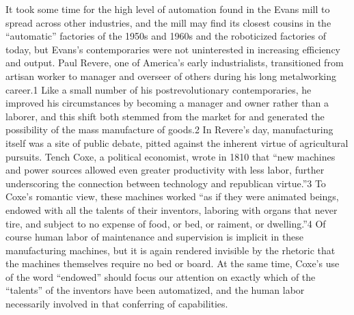 It took some time for the high level of automation found in the Evans
mill to spread across other industries, and the mill may find its
closest cousins in the “automatic” factories of the 1950s and 1960s
and the roboticized factories of today, but Evans's contemporaries
were not uninterested in increasing efficiency and output. Paul
Revere, one of America's early industrialists, transitioned from
artisan worker to manager and overseer of others during his long
metalworking career.1 Like a small number of his postrevolutionary
contemporaries, he improved his circumstances by becoming a manager
and owner rather than a laborer, and this shift both stemmed from the
market for and generated the possibility of the mass manufacture of
goods.2 In Revere's day, manufacturing itself was a site of public
debate, pitted against the inherent virtue of agricultural pursuits.
Tench Coxe, a political economist, wrote in 1810 that “new machines
and power sources allowed even greater productivity with less labor,
further underscoring the connection between technology and republican
virtue.”3 To Coxe's romantic view, these machines  worked “as if they
were animated beings, endowed with all the talents of their inventors,
laboring with organs that never tire, and subject to no expense of
food, or bed, or raiment, or dwelling.”4 Of course human labor of
maintenance and supervision is implicit in these manufacturing
machines, but it is again rendered invisible by the rhetoric that the
machines themselves require no bed or board. At the same time, Coxe's
use of the word “endowed” should focus our attention on exactly which
of the “talents” of the inventors have been automatized, and the human
labor necessarily involved in that conferring of capabilities. 


